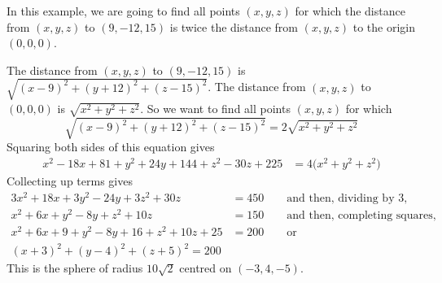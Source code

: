 \begin{eg}
In this example, we are going to find all points $(x,y,z)$ for which
the distance from $(x,y,z)$ to $(9,-12,15)$ is twice the distance from $(x,y,z)$   to the origin $(0,0,0)$.

The distance from $(x,y,z)$ to $(9,-12,15)$ is 
$\sqrt{(x-9)^2+(y+12)^2+(z-15)^2}$.
The distance from $(x,y,z)$ to $(0,0,0)$ is 
$\sqrt{x^2+y^2+z^2}$. So we want to find all points $(x,y,z)$ for which
\begin{equation*}
\sqrt{(x-9)^2+(y+12)^2+(z-15)^2}
=2\sqrt{x^2+y^2+z^2}
\end{equation*}
Squaring both sides of this equation gives
\begin{align*}
x^2-18x+81 +y^2+24y+144 +z^2-30z+225 &= 4\big(x^2+y^2+z^2)
\end{align*}
Collecting up terms gives
\begin{align*}
3x^2+18x +3y^2-24y +3z^2+30z &= 450\qquad\text{and then, dividing by $3$,} \\
x^2+6x +y^2-8y +z^2+10z &= 150\qquad\text{and then, completing squares,} \\
x^2+6x +9 +y^2-8y +16  +z^2+10z +25 &= 200\qquad\text{or}\\
(x+3)^2+(y-4)^2+(z+5)^2 =200 
\end{align*}
This is the sphere of radius $10\sqrt{2}$ centred on $(-3,4,-5)$.
\end{eg}

